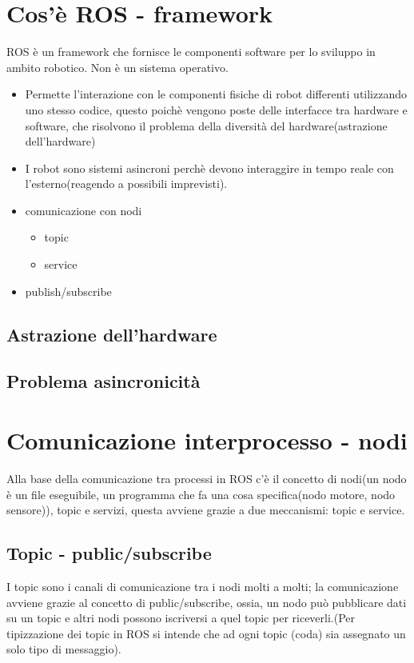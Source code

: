 \documentclass{report}
\begin{document}
\section{Cos'è ROS - framework}
ROS è un framework che fornisce le componenti software per lo sviluppo in ambito robotico. Non è un sistema operativo. 
\begin{itemize}
    \item Permette l’interazione con le componenti fisiche di robot differenti utilizzando uno stesso codice, questo poichè vengono poste delle interfacce tra hardware e software, che risolvono il problema della diversità del hardware(astrazione dell’hardware)
    \item I robot sono sistemi asincroni perchè devono interaggire in tempo reale con l’esterno(reagendo a possibili imprevisti).
    \item comunicazione con nodi
    \begin{itemize}
        \item topic
        \item service
    \end{itemize}
    \item publish/subscribe
\end{itemize}

\subsection{Astrazione dell'hardware}
\subsection{Problema asincronicità}

\section{Comunicazione interprocesso - nodi}
Alla base della comunicazione tra processi in ROS c’è il concetto di nodi(un nodo è un file eseguibile, un programma che fa una cosa specifica(nodo motore, nodo sensore)), topic e servizi, questa avviene grazie a due meccanismi: topic e service.

\subsection{Topic - public/subscribe}
I topic sono i canali di comunicazione tra i nodi molti a molti; la comunicazione avviene grazie al concetto di public/subscribe, ossia, un nodo può pubblicare dati su un topic e altri nodi possono iscriversi a quel topic per riceverli.(Per tipizzazione dei topic in ROS si intende che ad ogni topic (coda) sia assegnato un solo tipo di messaggio).
\end{document}
